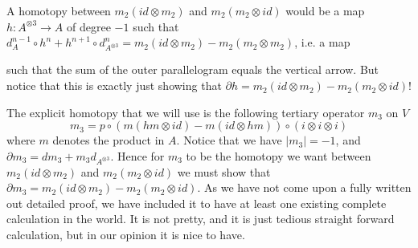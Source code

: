 A homotopy between $m_2(id\otimes m_2)$ and $m_2(m_2\otimes id)$ would be a map $h\colon A^{\otimes 3}\longrightarrow A$ of degree $-1$ such that $d_A^{n-1}\circ h^{n} + h^{n+1}\circ d_{A^{\otimes 3}}^n = m_2(id\otimes m_2)-m_2(m_2\otimes m_2)$, i.e. a map
\begin{center}
\end{center}
such that the sum of the outer parallelogram equals the vertical arrow. But notice that this is exactly just showing that $\partial h = m_2(id\otimes m_2)-m_2(m_2\otimes id)$!

The explicit homotopy that we will use is the following tertiary operator $m_3$ on $V$
\begin{equation*}
    m_3 = p\circ (m(hm\otimes id)-m(id\otimes hm))\circ (i\otimes i \otimes i)
\end{equation*}
where $m$ denotes the product in $A$. Notice that we have $|m_3|=-1$, and $\partial m_3 = dm_3 + m_3 d_{A^{\otimes 3}}$. Hence for $m_3$ to be the homotopy we want between $m_2(id\otimes m_2)$ and $m_2(m_2\otimes id)$ we must show that $\partial m_3 = m_2(id\otimes m_2)-m_2(m_2\otimes id)$. As we have not come upon a fully written out detailed proof, we have included it to have at least one existing complete calculation in the world. It is not pretty, and it is just tedious straight forward calculation, but in our opinion it is nice to have. 

